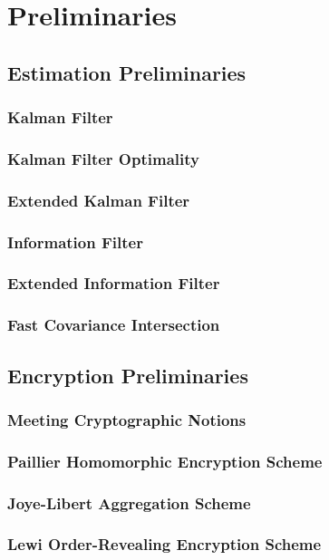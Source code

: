 
\chapter{Preliminaries}
\section{Estimation Preliminaries}
\subsection{Kalman Filter}
\subsection{Kalman Filter Optimality}
\subsection{Extended Kalman Filter}
\subsection{Information Filter}
\subsection{Extended Information Filter}
\subsection{Fast Covariance Intersection}
\section{Encryption Preliminaries}
\subsection{Meeting Cryptographic Notions}
\subsection{Paillier Homomorphic Encryption Scheme}
\subsection{Joye-Libert Aggregation Scheme}
\subsection{Lewi Order-Revealing Encryption Scheme}